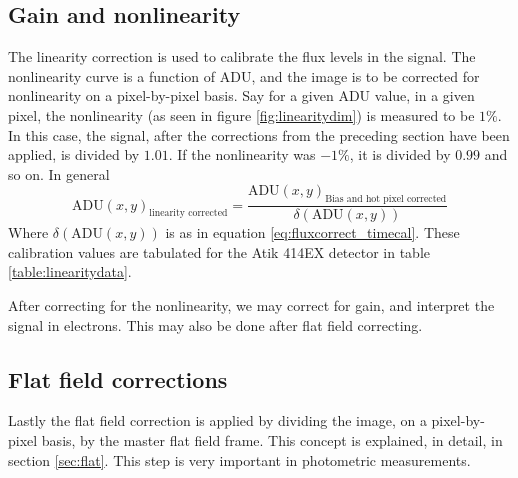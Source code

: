 \documentclass[../main.tex]{subfiles}
\begin{document}
	\subsection{Gain and nonlinearity}
	The linearity correction is used to calibrate the flux levels in the signal. The nonlinearity curve is a function of ADU, and the image is to be corrected for nonlinearity on a pixel-by-pixel basis. Say for a given ADU value, in a given pixel, the nonlinearity (as seen in figure \ref{fig:linearitydim}) is measured to be $1\%$. In this case, the signal, after the corrections from the preceding section have been applied, is divided by $1.01$. If the nonlinearity was $-1\%$, it is divided by $0.99$ and so on. In general
	\begin{equation}
		\text{ADU}(x,y)_\text{linearity corrected} = \frac{\text{ADU}(x,y)_\text{Bias and hot pixel corrected}}{\delta(\text{ADU}(x,y))}
	\end{equation}
	 Where $\delta(\text{ADU}(x,y))$ is as in equation \ref{eq:fluxcorrect_timecal}. These calibration values are tabulated for the Atik 414EX detector in table \ref{table:linearitydata}.
	 
	 After correcting for the nonlinearity, we may correct for gain, and interpret the signal in electrons. This may also be done after flat field correcting.
	 
	 \subsection{Flat field corrections}
	 Lastly the flat field correction is applied by dividing the image, on a pixel-by-pixel basis, by the master flat field frame. This concept is explained, in detail, in section \ref{sec:flat}. This step is very important in photometric measurements.
	 
\end{document}

